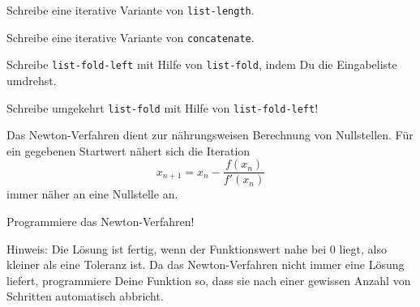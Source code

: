 \begin{aufgabe}
  Schreibe eine iterative Variante von \texttt{list-length}.
\end{aufgabe}

\begin{aufgabe}
  Schreibe eine iterative Variante von \texttt{concatenate}.
\end{aufgabe}

\begin{aufgabeinline}
  Schreibe \lstinline{list-fold-left} mit Hilfe von \lstinline{list-fold},
  indem Du die Eingabeliste umdrehst.

  Schreibe umgekehrt \lstinline{list-fold} mit Hilfe von
  \lstinline{list-fold-left}!
\end{aufgabeinline}

\begin{aufgabe}
  Das Newton-Verfahren dient zur nährungsweisen
  Berechnung von Nullstellen. Für ein gegebenen Startwert nähert sich die
  Iteration 
  \begin{displaymath}
    x_{n+1} = x_n - \frac{f(x_n)}{f'(x_n)}
  \end{displaymath}
  immer näher an eine Nullstelle an.

  Programmiere das Newton-Verfahren!
  
  Hinweis: Die Lösung ist fertig, wenn der Funktionswert nahe bei 0
  liegt, also kleiner als eine Toleranz ist.  Da das Newton-Verfahren
  nicht immer eine Lösung liefert, programmiere Deine Funktion so,
  dass sie nach einer gewissen Anzahl von Schritten automatisch
  abbricht.
\end{aufgabe}



